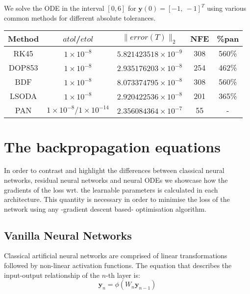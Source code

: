 \documentclass{article}
\begin{document}
    We solve the ODE in the interval $[0,6]$ for $\pmb{y}(0) = [-1,\ -1]^T$ using various common methods for
    different absolute tolerances.

    \begin{center}
    {\tabulinesep=1.2mm
        \begin{tabu}{ |c| c| c| c| c| }
            \hline
            Method & $atol$/$etol$                          & $ \lVert error(T) \rVert_{2}$  & NFE & \%pan \\
            \hline
            RK45   & $1 \times 10^{-8}$                     & $ 5.821423518 \times 10^{-9} $ & 308 & 560\% \\
            \hline
            DOP853 & $1 \times 10^{-8}$                     & $ 2.935176203 \times 10^{-8} $ & 254 & 462\% \\
            \hline
            BDF    & $1 \times 10^{-8}$                     & $ 8.073374795 \times 10^{-8} $ & 308 & 560\% \\
            \hline
            LSODA  & $1 \times 10^{-8}$                     & $ 2.920422536 \times 10^{-8} $ & 201 & 365\% \\
            \hline
            PAN    & $1 \times 10^{-8} / 1 \times 10^{-14}$ & $ 2.356084364 \times 10^{-7} $ & 55  & -     \\
            \hline
        \end{tabu}
    }
    \end{center}

    \printbibliography

    \appendix


    \section{The backpropagation equations}
    In order to contrast and highlight the differences between classical neural networks, residual neural networks and neural ODEs we showcase how the gradients of the loss wrt.
    the learnable parameters is calculated in each architecture.
    This quantity is necessary in order to minimise the loss of the network using any -gradient descent based- optimisation algorithm.

    \subsection{Vanilla Neural Networks}
    Classical artificial neural networks are comprised of linear transformations followed by non-linear activation functions.
    The equation that describes the input-output relationship of the $n$-th layer is:
    \begin{equation}
        \bm{y}_{n} = \phi( W_{n} \bm{y}_{n-1} )
    \end{equation}
\end{document}
